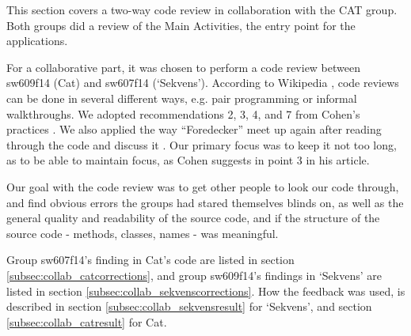 This section covers a two-way code review in collaboration with the CAT group. Both groups did a review of the Main Activities, the entry point for the applications.

For a collaborative part, it was chosen to perform a code review between sw609f14 (Cat) and sw607f14 (`Sekvens'). According to Wikipedia \cite{wiki-code-review}, code reviews can be done in several different ways, e.g. pair programming or informal walkthroughs. We adopted recommendations 2, 3, 4, and 7 from Cohen's practices \cite{s4-collab-cr-ibm}. We also applied the way ``Foredecker'' meet up again after reading through the code and discuss it \cite{s4-collab-cr-so}. Our primary focus was to keep it not too long, as to be able to maintain focus, as Cohen suggests in point 3 in his article.

Our goal with the code review was to get other people to look our code through, and find obvious errors the groups had stared themselves blinds on, as well as the general quality and readability of the source code, and if the structure of the source code - methods, classes, names - was meaningful.

Group sw607f14's finding in Cat's code are listed in section \ref{subsec:collab_catcorrections}, and group sw609f14's findings in `Sekvens' are listed in section \ref{subsec:collab_sekvenscorrections}. How the feedback was used, is described in section \ref{subsec:collab_sekvensresult} for `Sekvens', and section \ref{subsec:collab_catresult} for Cat.